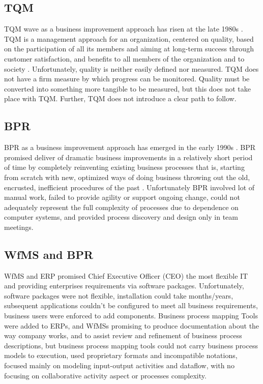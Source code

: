 \documentclass[12pt,a4paper,final,twoside,onecolumn,titlepage]{book}
\begin{document}
\subsection{TQM}
\gls{TQM} wave as a business improvement approach has risen at the late 1980s \cite{BS19}. TQM is a management approach for an organization, centered on quality, based on the participation of all its members and aiming at long-term success through customer satisfaction, and benefits to all members of the organization and to society \cite{BS22}. Unfortunately, quality is neither easily defined nor measured. TQM does not have a firm measure by which progress can be monitored. Quality must be converted into something more tangible to be measured, but this does not take place with TQM. Further, TQM does not introduce a clear path to follow.

\subsection{BPR}
\gls{BPR} as a business improvement approach has emerged in the early 1990s \cite{BS06}. BPR promised deliver of dramatic business improvements in a relatively short period of time by completely reinventing existing business processes that is, starting from scratch with new, optimized ways of doing business throwing out the old, encrusted, inefficient procedures of the past \cite{BS06,BS19}.   Unfortunately BPR involved lot of manual work, failed to provide agility or support ongoing change, could not adequately represent the full complexity of processes due to dependence on computer systems, and provided process discovery and design only in team meetings.

\subsection{WfMS and BPR}
\gls{WfMS} and \gls{ERP} promised Chief Executive Officer (CEO) the most flexible IT and providing enterprises requirements via software packages. Unfortunately, software packages were not flexible, installation could take months/years, subsequent applications couldn't be configured to meet all business requirements, business users were enforced to add components. Business process mapping Tools were added to ERPs, and WfMSs promising to produce documentation about the way company works, and to assist review and refinement of business process descriptions, but business process mapping tools could not carry business process models to execution, used proprietary formats and incompatible notations, focused mainly on modeling input-output activities and dataflow, with no focusing on collaborative activity aspect or processes complexity.
\end{document}

